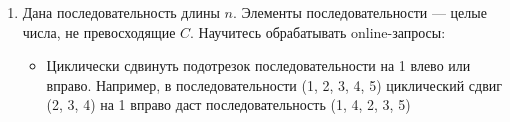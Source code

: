 \begin{enumerate}
\begin{itemize}
\begin{itemize}
        Стоимость: $\O(\sqrt{n} \log n)$ на каждый из $\leq 2$ крайних блоков.

        \item Для полных блоков: обновляем $f := \max(f, x)$.
        
        Стоимость: $\O(1)$ на блок, всего $\O(\sqrt{n})$ полных блоков.

      \end{itemize}
      Итого на запрос: $\O(\sqrt{n} \log n)$.

      \item Сложность по времени:
      \begin{itemize}
        \item Предподсчёт: сортировка каждого из $n / \sqrt{n} = \sqrt{n}$ блоков размера $\sqrt{n}$: \newline
        $\O(\sqrt{n} \cdot \sqrt{n} \log \sqrt{n}) = \O(n \log n)$

        \item Каждый запрос: $\O(\sqrt{n} \log n)$
      \end{itemize}

      Итого: $\O(n \log n + m\sqrt{n} \log n)$

      \item Сложность по памяти:
      \begin{itemize}
        \item Массив $array$: $\O(n)$

        \item Отсортированные копии и префиксные суммы: $\O(n)$

        \item Значения $f$ для каждого блока: $\O(\sqrt{n})$
      \end{itemize}

      Итого: $\O(n)$

    \end{itemize}

  \item
    Дана последовательность длины $n$. Элементы последовательности --- целые числа, не превосходящие $C$.
    Научитесь обрабатывать online-запросы:

    \begin{itemize}
      \item Циклически сдвинуть подотрезок последовательности на 1 влево или вправо.
        Например, в последовательности (1, 2, 3, 4, 5) циклический сдвиг
        (2, 3, 4) на 1 вправо даст последовательность (1, 4, 2, 3, 5)


\end{itemize}
\end{enumerate}
